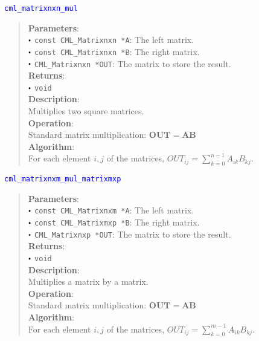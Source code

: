 \documentclass[a4paper,oneside,8pt]{extarticle}
\newcommand{\function}[1]{
  \noindent\textcolor{blue}{\texttt{#1}}
  \vspace{-0.3em}
}
\renewcommand{\dot}{\raisebox{0.3ex}{\scalebox{0.6}{$\bullet$}}}
\theoremstyle{definition}
\begin{document}
\function{cml\_matrixnxn\_mul}
\begin{quote}
  \textbf{Parameters}: \\
  $\dot$ \texttt{const CML\_Matrixnxn *A}: The left matrix. \\
  $\dot$ \texttt{const CML\_Matrixnxn *B}: The right matrix. \\
  $\dot$ \texttt{CML\_Matrixnxn *OUT}: The matrix to store the result. \\
  \textbf{Returns}: \\
  $\dot$ \texttt{void} \\

  \vspace{-0.75em}
  \textbf{Description}: \\
  Multiplies two square matrices. \\

  \vspace{-0.75em}
  \textbf{Operation}: \\
  Standard matrix multiplication: $\mathbf{OUT} = \mathbf{A}\mathbf{B}$ \\

  \vspace{-0.75em}
  \textbf{Algorithm}: \\
  For each element $i, j$ of the matrices, $OUT_{ij} = \sum_{k=0}^{n-1} A_{ik}B_{kj}$. \\
\end{quote}

\function{cml\_matrixnxm\_mul\_matrixmxp}
\begin{quote}
  \textbf{Parameters}: \\
  $\dot$ \texttt{const CML\_Matrixnxm *A}: The left matrix. \\
  $\dot$ \texttt{const CML\_Matrixmxp *B}: The right matrix. \\
  $\dot$ \texttt{CML\_Matrixnxp *OUT}: The matrix to store the result. \\
  \textbf{Returns}: \\
  $\dot$ \texttt{void} \\

  \vspace{-0.75em}
  \textbf{Description}: \\
  Multiplies a matrix by a matrix. \\

  \vspace{-0.75em}
  \textbf{Operation}: \\
  Standard matrix multiplication: $\mathbf{OUT} = \mathbf{A}\mathbf{B}$ \\

  \vspace{-0.75em}
  \textbf{Algorithm}: \\
  For each element $i, j$ of the matrices, $OUT_{ij} = \sum_{k=0}^{m-1} A_{ik}B_{kj}$. \\
\end{quote}
\end{document}
